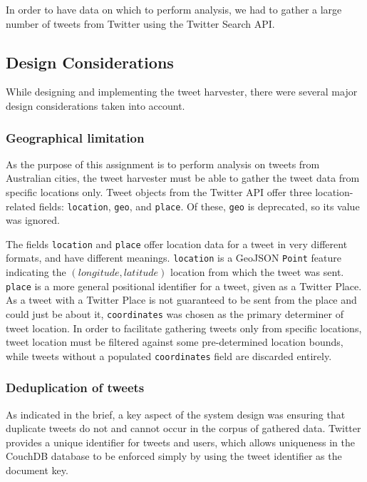 In order to have data on which to perform analysis, we had to gather a large number of tweets from Twitter using the Twitter Search API. 

\subsection{Design Considerations}

While designing and implementing the tweet harvester, there were several major design considerations taken into account.

\subsubsection{Geographical limitation}

As the purpose of this assignment is to perform analysis on tweets from Australian cities, the tweet harvester must be able to gather the tweet data from specific locations only. Tweet objects from the Twitter API offer three location-related fields: \texttt{location}, \texttt{geo}, and \texttt{place}. Of these, \texttt{geo} is deprecated, so its value was ignored.

The fields \texttt{location} and \texttt{place} offer location data for a tweet in very different formats, and have different meanings. \texttt{location} is a GeoJSON \texttt{Point} feature indicating the $(longitude, latitude)$ location from which the tweet was sent. \texttt{place} is a more general positional identifier for a tweet, given as a Twitter Place. As a tweet with a Twitter Place is not guaranteed to be sent from the place and could just be about it, \texttt{coordinates} was chosen as the primary determiner of tweet location. In order to facilitate gathering tweets only from specific locations, tweet location must be filtered against some pre-determined location bounds, while tweets without a populated \texttt{coordinates} field are discarded entirely.

\subsubsection{Deduplication of tweets}

As indicated in the brief, a key aspect of the system design was ensuring that duplicate tweets do not and cannot occur in the corpus of gathered data. Twitter provides a unique identifier for tweets and users, which allows uniqueness in the CouchDB database to be enforced simply by using the tweet identifier as the document key.


